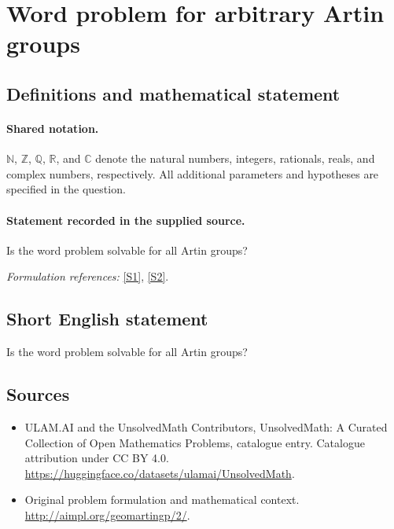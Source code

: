 \documentclass[11pt]{article}
\newcommand{\sref}[2]{\hyperlink{source:#1:#2}{[S#2]}}
\begin{document}
\section{Word problem for arbitrary Artin groups}\label{statement}

\subsection{Definitions and mathematical statement}

\paragraph{Shared notation.}$\mathbb N$, $\mathbb Z$, $\mathbb Q$, $\mathbb R$, and $\mathbb C$ denote the natural numbers, integers, rationals, reals, and complex numbers, respectively. All additional parameters and hypotheses are specified in the question.


\paragraph{Statement recorded in the supplied source.}
Is the word problem solvable for all Artin groups?
\par\smallskip\textit{Formulation references:} \sref{statement}{1}, \sref{statement}{2}.
\subsection{Short English statement}
Is the word problem solvable for all Artin groups?
\subsection{Sources}
\begin{itemize}
\item[\hypertarget{source:statement:1}{S1}] ULAM.AI and the UnsolvedMath Contributors, UnsolvedMath: A Curated Collection of Open Mathematics Problems, catalogue entry. Catalogue attribution under CC BY 4.0.
\url{https://huggingface.co/datasets/ulamai/UnsolvedMath}.
\item[\hypertarget{source:statement:2}{S2}] Original problem formulation and mathematical context.
\url{http://aimpl.org/geomartingp/2/}.
\end{itemize}
\label{end:statement}
\end{document}
